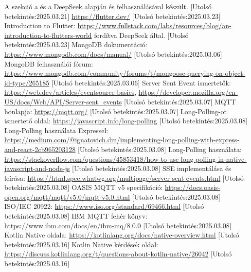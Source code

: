 \documentclass{thesis-ekf}
\theoremstyle{definition}
\theoremstyle{remark}
\begin{document}
\begin{thebibliography}{8}
	A szekció a \href{https://blockchainsimplified.com/blog/mongodb-introduction/}{\color{blue}{Blockchain Simplified}} és a DeepSeek alapján és felhasználásával készült.
	[Utolsó betekintés:2025.03.21]
	\url{https://flutter.dev/}
	[Utolsó betekintés:2025.03.23]
	Introduction to Flutter: \url{https://www.fullstack.com/labs/resources/blog/an-introduction-to-flutters-world} fordítva DeepSeek által.
	[Utolsó betekintés:2025.03.23]
	MongoDB dokumentáció: \url{https://www.mongodb.com/docs/manual/} [Utolsó betekintés:2025.03.06]
	MongoDB felhasználói fórum: \url{https://www.mongodb.com/community/forums/t/mongoose-querying-on-object-id-type/265185}
	[Utolsó betekintés:2025.03.06]
	Server Sent Event ismertetők: \url{https://web.dev/articles/eventsource-basics}, \url{https://developer.mozilla.org/en-US/docs/Web/API/Server-sent_events}
	[Utolsó betekintés:2025.03.07]
	 MQTT honlapja: \url{https://mqtt.org/}
	[Utolsó betekintés:2025.03.07]
	 Long-Polling-ot ismertető oldal: \url{https://javascript.info/long-polling}
	[Utolsó betekintés:2025.03.08]
	 Long-Polling használata Expressel: \url{https://medium.com/@ignatovich.dm/implementing-long-polling-with-express-and-react-2cb965203128}
	[Utolsó betekintés:2025.03.08]
	 Long-Polling használata: \url{https://stackoverflow.com/questions/45853418/how-to-use-long-polling-in-native-javascript-and-node-js}
	[Utolsó betekintés:2025.03.08]
	 SSE implementálása és leírása: \url{https://html.spec.whatwg.org/multipage/server-sent-events.html}
	[Utolsó betekintés:2025.03.08]
	OASIS MQTT v5 specifikáció: \url{https://docs.oasis-open.org/mqtt/mqtt/v5.0/mqtt-v5.0.html}
	[Utolsó betekintés:2025.03.08]
	 ISO/IEC 20922: \url{https://www.iso.org/standard/69466.html}
	[Utolsó betekintés:2025.03.08]
	 IBM MQTT fehér könyv: \url{https://www.ibm.com/docs/en/ibm-mq/8.0.0}
	[Utolsó betekintés:2025.03.08]
	 Kotlin Native oldala: \url{https://kotlinlang.org/docs/native-overview.html}
	[Utolsó betekintés:2025.03.16]
	 Kotlin Native kérdések oldal: \url{https://discuss.kotlinlang.org/t/questions-about-kotlin-native/26042}
	[Utolsó betekintés:2025.03.16]

\end{thebibliography}
\end{document}
